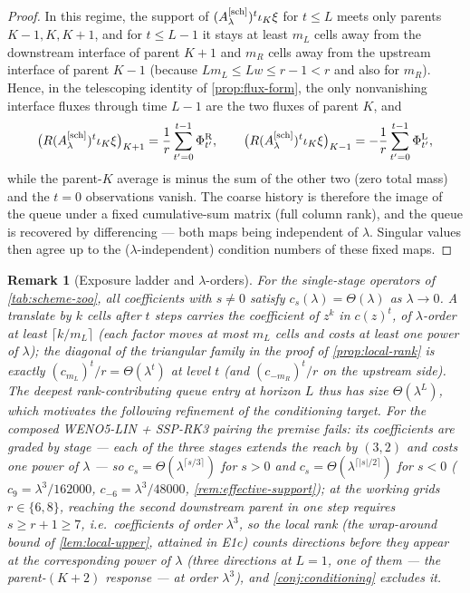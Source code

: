 \documentclass[pdflatex,sn-mathphys-num]{sn-jnl}%
\theoremstyle{thmstyleone}%
\theoremstyle{thmstyletwo}%
\newtheorem{remark}{Remark}%
\theoremstyle{thmstylethree}%
\newcommand{\Asch}{A^{[\rm sch]}_\lambda}
\begin{document}
\begin{proof}
In this regime, the support of $(\Asch)^t\iota_K\xi$ for $t\le L$ meets only parents $K-1,K,K+1$, and for $t\le L-1$ it stays at least $m_L$ cells away from the downstream interface of parent $K+1$ and $m_R$ cells away from the upstream interface of parent $K-1$ (because $Lm_L\le Lw\le r-1<r$ and also for $m_R$).
Hence, in the telescoping identity of \cref{prop:flux-form}, the only nonvanishing interface fluxes through time $L-1$ are the two fluxes of parent $K$, and \[ \bigl(R(\Asch)^t\iota_K\xi\bigr)_{K+1} =\frac1r\sum_{t'=0}^{t-1}\Phi^{\rm R}_{t'}, \qquad \bigl(R(\Asch)^t\iota_K\xi\bigr)_{K-1} =-\frac1r\sum_{t'=0}^{t-1}\Phi^{\rm L}_{t'}, \] while the parent-$K$ average is minus the sum of the other two (zero total mass) and the $t=0$ observations vanish.
The coarse history is therefore the image of the queue under a fixed cumulative-sum matrix (full column rank), and the queue is recovered by differencing --- both maps being independent of $\lambda$.
Singular values then agree up to the ($\lambda$-independent) condition numbers of these fixed maps.
\end{proof}

\begin{remark}[Exposure ladder and $\lambda$-orders]\label{rem:lambda-orders}
For the single-stage operators of \cref{tab:scheme-zoo}, all coefficients with $s\ne0$ satisfy $c_s(\lambda)=\Theta(\lambda)$ as $\lambda\to0$.
A translate by $k$ cells after $t$ steps carries the coefficient of $z^k$ in $c(z)^t$, of $\lambda$-order at least $\lceil k/m_L\rceil$ (each factor moves at most $m_L$ cells and costs at least one power of $\lambda$); the diagonal of the triangular family in the proof of \cref{prop:local-rank} is exactly $(c_{m_{L}})^t/r=\Theta(\lambda^t)$ at level $t$ (and $(c_{-m_R})^t/r$ on the upstream side).
The deepest rank-contributing queue entry at horizon $L$ thus has size $\Theta(\lambda^{L})$, which motivates the following refinement of the conditioning target.
For the composed WENO5-LIN + SSP-RK3 pairing the premise fails: its coefficients are graded by stage --- each of the three stages extends the reach by $(3,2)$ and costs one power of $\lambda$ --- so $c_s=\Theta(\lambda^{\lceil s/3\rceil})$ for $s>0$ and $c_s=\Theta(\lambda^{\lceil|s|/2\rceil})$ for $s<0$ ($c_9=\lambda^{3}/162000$, $c_{-6}=\lambda^{3}/48000$, \cref{rem:effective-support}); at the working grids $r\in\{6,8\}$, reaching the second downstream parent in one step requires $s\ge r+1\ge7$, i.e.\ coefficients of order $\lambda^{3}$, so the local rank (the wrap-around bound of \cref{lem:local-upper}, attained in E1c) counts directions before they appear at the corresponding power of $\lambda$ (three directions at $L=1$, one of them --- the parent-$(K+2)$ response --- at order $\lambda^{3}$), and \cref{conj:conditioning} excludes it.
\end{remark}
\end{document}
